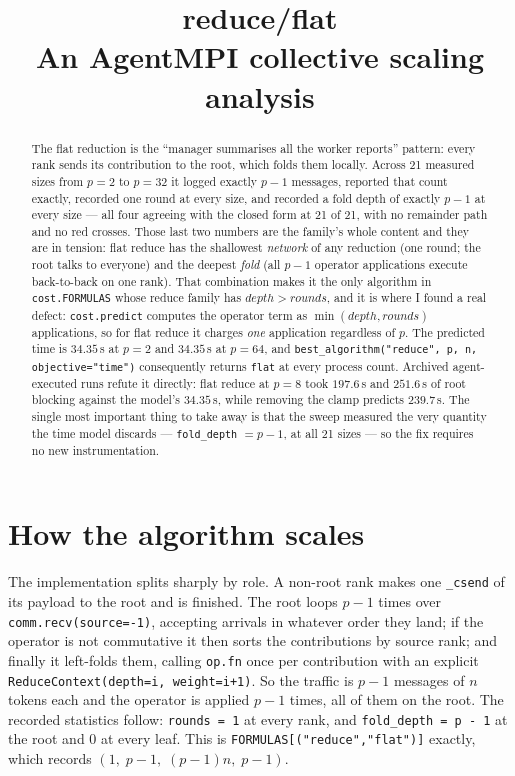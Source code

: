 \documentclass[11pt]{article}
\title{\textbf{reduce/flat}\\[2pt]\large An AgentMPI collective scaling analysis}
\author{}
\date{}
\begin{document}
\maketitle

\begin{abstract}
The flat reduction is the ``manager summarises all the worker reports'' pattern: every rank
sends its contribution to the root, which folds them locally. Across 21 measured sizes from
$p=2$ to $p=32$ it logged exactly $p-1$ messages, reported that count exactly, recorded one
round at every size, and recorded a fold depth of exactly $p-1$ at every size --- all four
agreeing with the closed form at 21 of 21, with no remainder path and no red crosses. Those
last two numbers are the family's whole content and they are in tension: flat reduce has the
shallowest \emph{network} of any reduction (one round; the root talks to everyone) and the
deepest \emph{fold} (all $p-1$ operator applications execute back-to-back on one rank). That
combination makes it the only algorithm in \texttt{cost.FORMULAS} whose reduce family has
$\mathit{depth} > \mathit{rounds}$, and it is where I found a real defect: \texttt{cost.predict}
computes the operator term as $\min(\mathit{depth}, \mathit{rounds})$ applications, so for flat
reduce it charges \emph{one} application regardless of $p$. The predicted time is $34.35$\,s at
$p=2$ and $34.35$\,s at $p=64$, and \texttt{best\_algorithm("reduce", p, n, objective="time")}
consequently returns \texttt{flat} at every process count. Archived agent-executed runs refute
it directly: flat reduce at $p=8$ took $197.6$\,s and $251.6$\,s of root blocking against the
model's $34.35$\,s, while removing the clamp predicts $239.7$\,s. The single most important
thing to take away is that the sweep measured the very quantity the time model discards ---
\texttt{fold\_depth} $= p-1$, at all 21 sizes --- so the fix requires no new instrumentation.
\end{abstract}



\section{How the algorithm scales}

The implementation splits sharply by role. A non-root rank makes one \texttt{\_csend} of its
payload to the root and is finished. The root loops $p-1$ times over
\texttt{comm.recv(source=-1)}, accepting arrivals in whatever order they land; if the operator
is not commutative it then sorts the contributions by source rank; and finally it left-folds
them, calling \texttt{op.fn} once per contribution with an explicit
\texttt{ReduceContext(depth=i, weight=i+1)}. So the traffic is $p-1$ messages of $n$ tokens
each and the operator is applied $p-1$ times, all of them on the root. The recorded statistics
follow: \texttt{rounds = 1} at every rank, and \texttt{fold\_depth = p - 1} at the root and $0$
at every leaf. This is \texttt{FORMULAS[("reduce","flat")]} exactly, which records
$(1,\;p-1,\;(p-1)n,\;p-1)$.
\end{document}
